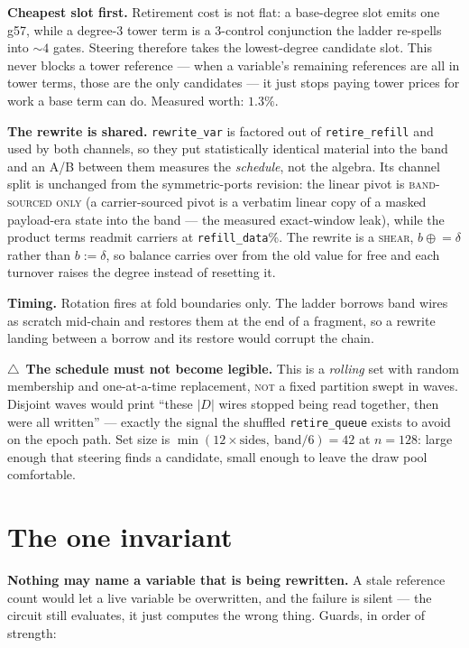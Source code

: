 \documentclass[11pt]{article}
\newcommand{\XOR}{\oplus}
\begin{document}
\medskip\noindent
\textbf{Cheapest slot first.} Retirement cost is not flat: a base-degree slot
emits one g57, while a degree-3 tower term is a 3-control conjunction the
ladder re-spells into ${\sim}4$ gates. Steering therefore takes the
lowest-degree candidate slot. This never blocks a tower reference --- when a
variable's remaining references are all in tower terms, those are the only
candidates --- it just stops paying tower prices for work a base term can do.
Measured worth: $1.3\%$.

\medskip\noindent
\textbf{The rewrite is shared.} \texttt{rewrite\_var} is factored out of
\texttt{retire\_refill} and used by both channels, so they put statistically
identical material into the band and an A/B between them measures the
\emph{schedule}, not the algebra. Its channel split is unchanged from the
symmetric-ports revision: the linear pivot is \textsc{band-sourced only} (a
carrier-sourced pivot is a verbatim linear copy of a masked payload-era state
into the band --- the measured exact-window leak), while the product terms
readmit carriers at \texttt{refill\_data}\%. The rewrite is a \textsc{shear},
$b \mathrel{\XOR}= \delta$ rather than $b := \delta$, so balance carries over
from the old value for free and each turnover raises the degree instead of
resetting it.

\medskip\noindent
\textbf{Timing.} Rotation fires at fold boundaries only. The ladder borrows
band wires as scratch mid-chain and restores them at the end of a fragment, so
a rewrite landing between a borrow and its restore would corrupt the chain.

\medskip\noindent
$\triangle$~\textbf{The schedule must not become legible.} This is a
\emph{rolling} set with random membership and one-at-a-time replacement,
\textsc{not} a fixed partition swept in waves. Disjoint waves would print
``these $|D|$ wires stopped being read together, then were all written'' ---
exactly the signal the shuffled \texttt{retire\_queue} exists to avoid on the
epoch path. Set size is $\min(12 \times \text{sides},\ \text{band}/6) = 42$ at
$n=128$: large enough that steering finds a candidate, small enough to leave
the draw pool comfortable.

\section{The one invariant}

\textbf{Nothing may name a variable that is being rewritten.} A stale reference
count would let a live variable be overwritten, and the failure is silent ---
the circuit still evaluates, it just computes the wrong thing. Guards, in order
of strength:
\end{document}
